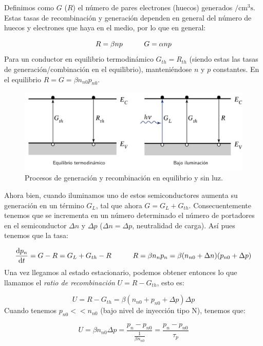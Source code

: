 Definimos como $G$ ($R$) el número de pares electrones (huecos) generados $/\mathrm{cm}^3\mathrm{s}$. Estas tasas de recombinación y generación dependen en general del número de huecos y electrones que haya en el medio, por lo que en general:

\begin{equation}
	R = \beta np \quad \quad \quad G = \alpha np
\end{equation}
Para un conductor en equilibrio termodinámico $G_{th}=R_{th}$ (siendo estas las tasas de generación/combinación en el equilibrio), manteniéndose $n$ y $p$ constantes. En el equilibrio  $R = G = \beta n_{n0}p_{n0}$.

\begin{figure}[h!] \centering
	\includegraphics[width=0.9\linewidth]{Cuerpo/Ch_02/02_Luz.png}
	\caption{Procesos de generación y recombinación en equilibrio y sin luz.}
\end{figure}
Ahora bien, cuando iluminamos uno de estos semiconductores aumenta su generación en un término $G_L$, tal que ahora $G=G_L+G_{th}$. Consecuentemente tenemos que se incrementa en un número determinado el número de portadores en el semiconductor $\Delta n$ y $\Delta p$ ($\Delta n = \Delta p$, neutralidad de carga). Así pues tenemos que la tasa:


\begin{equation}
	\frac{\mathrm{d} p_n}{\mathrm{d} t} = G-R=G_L + G_{th} - R \quad \quad \quad R = \beta n_n p_n = \beta (n_{n0}+\Delta n) (p_{n0}+\Delta p)
\end{equation}
Una vez llegamos al estado estacionario, podemos obtener entonces lo que llamamos el  \textit{ratio de recombinación} $U=R-G_{th}$, esto es:

\begin{equation}
	U = R-G_{th} = \beta (n_{n0}+p_{n0}+\Delta p)\Delta p
\end{equation}
Cuando tenemos $p_{n0}<<n_{n0}$ (bajo nivel de inyección tipo N), tenemos que:

\begin{equation}
	U = \beta n_{n0}\Delta p = \frac{p_n - p_{n0}}{\frac{1}{\beta n_{n0}}} =  \frac{p_n - p_{n0}}{\tau_p}
\end{equation}

